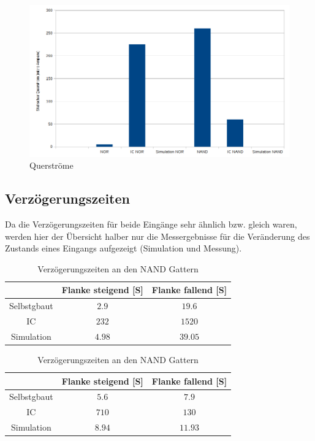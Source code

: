 \documentclass[11pt, a4paper]{article}
\begin{document}
\begin{figure}[H]
    \centering
    \includegraphics[width=\linewidth]{images/querstrom.png}
    \caption{Querströme}
    \label{graphQuerstrom}
\end{figure}


\subsection*{Verzögerungszeiten}
Da die Verzögerungszeiten für beide Eingänge sehr ähnlich bzw. gleich waren, werden hier der Übersicht halber nur die Messergebnisse für die Veränderung des Zustands eines Eingangs aufgezeigt (Simulation und Messung).

\begin{table}[H]
	\center
	\begin{tabular}{c|c|c}
	& Flanke steigend [\si{\micro}S] & Flanke fallend [\si{\micro}S] 	\\ \hline
	Selbstgbaut & $2.9$ 	& $19.6$	\\
	IC 			& $232$ 	& $1520$	\\
	Simulation 	& $4.98$		& $39.05$\\
	\end{tabular}
	\caption{Verzögerungszeiten an den NOR Gattern}
	\label{verzögerungszeitenNOR}



	\center
	\begin{tabular}{c|c|c}
	& Flanke steigend [\si{\micro}S] & Flanke fallend [\si{\micro}S] 	\\ \hline
	Selbstgbaut & $5.6$ 	& $7.9$	\\
	IC 			& $710$ 	& $130$	\\
	Simulation 	& $8.94$		& $11.93$\\
	\end{tabular}
	\caption{Verzögerungszeiten an den NAND Gattern}
	\label{verzögerungszeitenNAND}
\end{table}
\end{document}
